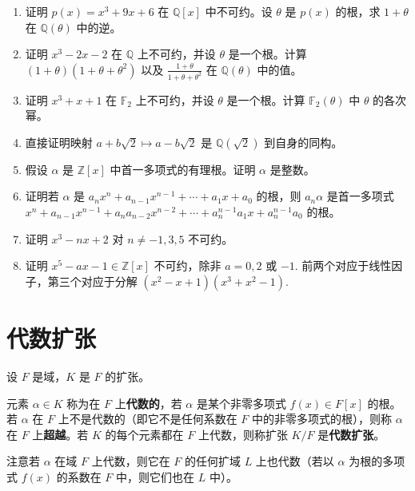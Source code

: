 \begin{enumerate}
\item 证明 \(p(x) = x^3+9x+6\) 在 \(\mathbb{Q}[x]\) 中不可约。设 \(\theta\) 是 \(p(x)\) 的根，求 \(1+\theta\) 在 \(\mathbb{Q}(\theta)\) 中的逆。

\item 证明 \(x^3-2x-2\) 在 \(\mathbb{Q}\) 上不可约，并设 \(\theta\) 是一个根。计算 \((1+\theta)(1+\theta+\theta^2)\) 以及 \(\frac{1+\theta}{1+\theta+\theta^2}\) 在 \(\mathbb{Q}(\theta)\) 中的值。

\item 证明 \(x^3+x+1\) 在 \(\mathbb{F}_2\) 上不可约，并设 \(\theta\) 是一个根。计算 \(\mathbb{F}_2(\theta)\) 中 \(\theta\) 的各次幂。

\item 直接证明映射 \(a+b\sqrt{2} \mapsto a-b\sqrt{2}\) 是 \(\mathbb{Q}(\sqrt{2})\) 到自身的同构。

\item 假设 \(\alpha\) 是 \(\mathbb{Z}[x]\) 中首一多项式的有理根。证明 \(\alpha\) 是整数。

\item 证明若 \(\alpha\) 是 \(a_nx^n+a_{n-1}x^{n-1}+\cdots+a_1x+a_0\) 的根，则 \(a_n\alpha\) 是首一多项式 \(x^n+a_{n-1}x^{n-1}+a_na_{n-2}x^{n-2}+\cdots+a_n^{n-1}a_1x+a_n^{n-1}a_0\) 的根。

\item 证明 \(x^3-nx+2\) 对 \(n \neq -1, 3, 5\) 不可约。

\item 证明 \(x^5-ax-1 \in \mathbb{Z}[x]\) 不可约，除非 \(a = 0, 2\) 或 \(-1\). 前两个对应于线性因子，第三个对应于分解 \((x^2-x+1)(x^3+x^2-1)\).
\end{enumerate}

\section{代数扩张}

设 \(F\) 是域，\(K\) 是 \(F\) 的扩张。

\begin{definition}
元素 \(\alpha \in K\) 称为在 \(F\) 上\textbf{代数的}，若 \(\alpha\) 是某个非零多项式 \(f(x) \in F[x]\) 的根。若 \(\alpha\) 在 \(F\) 上不是代数的（即它不是任何系数在 \(F\) 中的非零多项式的根），则称 \(\alpha\) 在 \(F\) 上\textbf{超越}。若 \(K\) 的每个元素都在 \(F\) 上代数，则称扩张 \(K/F\) 是\textbf{代数扩张}。
\end{definition}

注意若 \(\alpha\) 在域 \(F\) 上代数，则它在 \(F\) 的任何扩域 \(L\) 上也代数（若以 \(\alpha\) 为根的多项式 \(f(x)\) 的系数在 \(F\) 中，则它们也在 \(L\) 中）。

